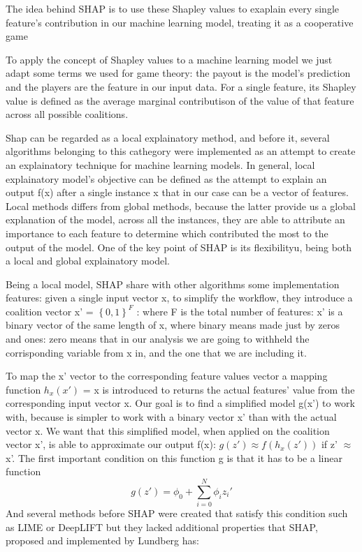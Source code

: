 \documentclass[10pt]{report}
\begin{document}
The idea behind SHAP is to use these Shapley values to exaplain every single feature's contribution in our machine learning model, treating it as a cooperative game

To apply the concept of Shapley values to a machine learning model we just adapt some terms we used for game theory: the payout is the model's prediction and the players are the feature in our input data.
For a single feature, its Shapley value is defined as the average marginal contributison of the value of that feature across all possible coalitions.

Shap can be regarded as a local explainatory method, and before it, several algorithms belonging to this cathegory were implemented as an attempt to create an explainatory technique for machine learning models.
In general, local explainatory model's objective can be defined as the attempt to explain an output f(x) after a single instance x that in our case can be a vector of features.
Local methods differs from global methods, because the latter provide us a global explanation of the model, across all the instances, they are able to attribute an importance to each feature to determine which contributed the most to the output of the model.
One of the key point of SHAP is its flexibilityu, being both a local and global explainatory model.

Being a local model, SHAP share with other algorithms some implementation features: given a single input vector x, to simplify the workflow, they introduce a coalition vector x' = $\left\{ 0, 1 \right\}^F$ : where F is the total number of features: x' is a binary vector of the same length of x, where binary means made just by zeros and ones: zero means that in our analysis we are going to withheld the corrisponding variable from x in, and the one that we are including it.

To map the x' vector to the corresponding feature values vector a mapping function $h_x(x')$ = x is introduced to returns the actual features' value from the corresponding input vector x.
Our goal is to find a simplified model g(x') to work with, because is simpler to work with a binary vector x' than with the actual vector x.
We want that this simplified model, when applied on the coalition vector x', is able to approximate our output f(x): $ g(z') \approx f(h_x(z'))$ if z' $\approx$ x'.
The first important condition on this function g is that it has to be a linear function
\begin{equation}
\label{eq:shap_g}
g(z') = \phi_0 + \sum_{i = 0}^N \phi_i z_i'
\end{equation}
And several methods before SHAP were created that satisfy this condition such as LIME \cite{ribeiro-2016} or DeepLIFT \cite{shrikumar-2017} but they lacked additional properties that SHAP, proposed and implemented by Lundberg \cite{ludberg-} has:
\end{document}
